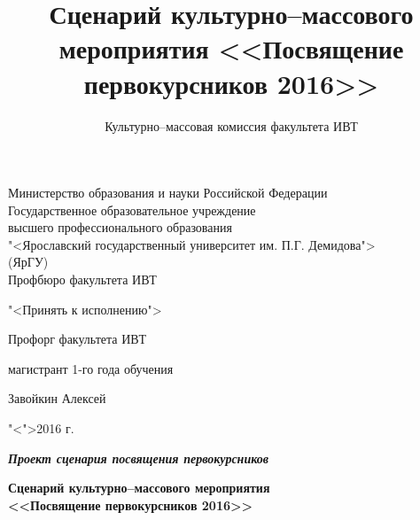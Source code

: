 \documentclass[a4paper, 14pt]{extarticle}
\title{Сценарий культурно--массового мероприятия <<Посвящение первокурсников 2016>>}
\author{Культурно--массовая комиссия факультета ИВТ}
\theoremstyle{definition}
\begin{document}
\setcounter{tocdepth}{3}

\makeatletter
\AtEndDocument{%
	\addtocounter{totfigures}{\value{figure}}%
	\addtocounter{tottables}{\value{table}}%
	\addtocounter{totsections}{\value{section}}%
	\immediate\write\@mainaux{%
		\string\gdef\string\totfig{\number\value{totfigures}}%
		\string\gdef\string\tottab{\number\value{tottables}}%
		\string\gdef\string\totsections{\number\value{totsections}}%
	}%
}
\makeatother


{
\thispagestyle{empty}

\begin{center}
	
	Министерство образования и науки Российской Федерации\\[0.3cm]
	Государственное образовательное учреждение\\
	высшего профессионального образования\\
	"<Ярославский государственный университет им. П.Г. Демидова">\\
	(ЯрГУ)\\[0.3cm]
	
	Профбюро факультета ИВТ
	
	\bigskip
	\bigskip	
	
	\hspace{15em}"<Принять к исполнению">
	
	\begin{flushright}
		Профорг факультета ИВТ\par
		магистрант 1-го года обучения\par
		\underline{\hspace{3.2cm}}Завойкин Алексей\par
		"<\underline{\hspace{0.5cm}}">\underline{\hspace{3.4cm}}2016 г.\par
	\end{flushright}
	
	\bigskip
	
	{\textbf
		{\textit
			{Проект сценария посвящения первокурсников}
		}
	}
	\\
	
	\bigskip
	\bigskip
	
	{\bf
		Сценарий культурно--массового мероприятия\\<<Посвящение первокурсников 2016>> 
	}
\end{center}

}
\end{document}
